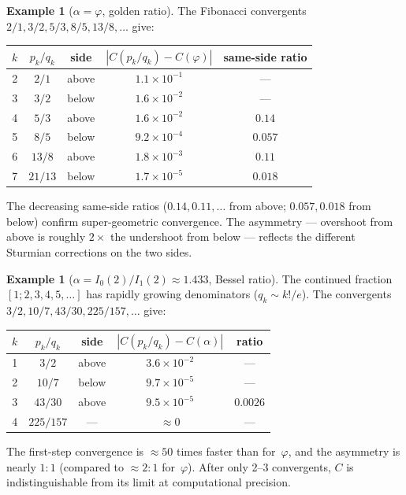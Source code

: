 \documentclass[11pt]{article}
\theoremstyle{definition}
\newtheorem{example}[theorem]{Example}
\theoremstyle{remark}
\begin{document}
\begin{example}[$\alpha = \varphi$, golden ratio]\label{ex:phi-conv}
The Fibonacci convergents $2/1, 3/2, 5/3, 8/5, 13/8, \ldots$ give:

\smallskip
\begin{center}
\begin{tabular}{ccccc}
\toprule
$k$ & $p_k/q_k$ & side & $|C(p_k/q_k) - C(\varphi)|$ & same-side ratio \\
\midrule
2 & $2/1$ & above & $1.1 \times 10^{-1}$ & --- \\
3 & $3/2$ & below & $1.6 \times 10^{-2}$ & --- \\
4 & $5/3$ & above & $1.6 \times 10^{-2}$ & $0.14$ \\
5 & $8/5$ & below & $9.2 \times 10^{-4}$ & $0.057$ \\
6 & $13/8$ & above & $1.8 \times 10^{-3}$ & $0.11$ \\
7 & $21/13$ & below & $1.7 \times 10^{-5}$ & $0.018$ \\
\bottomrule
\end{tabular}
\end{center}

\smallskip\noindent
The decreasing same-side ratios ($0.14, 0.11, \ldots$ from above;
$0.057, 0.018$ from below) confirm super-geometric convergence.
The asymmetry --- overshoot from above is roughly $2\times$ the
undershoot from below --- reflects the different Sturmian
corrections on the two sides.
\end{example}

\begin{example}[$\alpha = I_0(2)/I_1(2) \approx 1.433$, Bessel ratio]
\label{ex:bessel-conv}
The continued fraction $[1; 2, 3, 4, 5, \ldots]$ has rapidly
growing denominators ($q_k \sim k!/e$).
The convergents $3/2, 10/7, 43/30, 225/157, \ldots$ give:

\smallskip
\begin{center}
\begin{tabular}{ccccc}
\toprule
$k$ & $p_k/q_k$ & side & $|C(p_k/q_k) - C(\alpha)|$ & ratio \\
\midrule
1 & $3/2$ & above & $3.6 \times 10^{-2}$ & --- \\
2 & $10/7$ & below & $9.7 \times 10^{-5}$ & --- \\
3 & $43/30$ & above & $9.5 \times 10^{-5}$ & $0.0026$ \\
4 & $225/157$ & --- & $\approx 0$ & --- \\
\bottomrule
\end{tabular}
\end{center}

\smallskip\noindent
The first-step convergence is $\approx 50$ times faster than
for~$\varphi$, and the asymmetry is nearly $1:1$ (compared to
$\approx 2:1$ for~$\varphi$).
After only 2--3 convergents, $C$ is indistinguishable from its
limit at computational precision.
\end{example}
\end{document}

